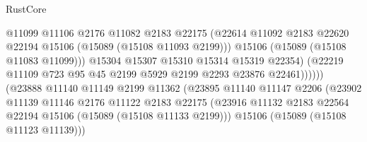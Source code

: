 \begin{lexlean}{RustCore}
\begin{coremodule}
                                          @11099
                                          @11106
                                          @2176
                                          @11082
                                          @2183
                                          @22175
                                          (@22614
                                            @11092
                                            @2183
                                            @22620
                                            @22194
                                            @15106
                                            (@15089 (@15108 @11093 @2199)))
                                          @15106
                                          (@15089 (@15108 @11083 @11099)))
                                        @15304
                                        @15307
                                        @15310
                                        @15314
                                        @15319
                                        @22354)
                                      (@22219
                                        @11109
                                        @723
                                        @95
                                        @45
                                        @2199
                                        @5929
                                        @2199
                                        @2293
                                        @23876
                                        @22461))))))
                            (@23888
                              @11140
                              @11149
                              @2199
                              @11362
                              (@23895
                                @11140
                                @11147
                                @2206
                                (@23902
                                  @11139
                                  @11146
                                  @2176
                                  @11122
                                  @2183
                                  @22175
                                  (@23916
                                    @11132
                                    @2183
                                    @22564
                                    @22194
                                    @15106
                                    (@15089 (@15108 @11133 @2199)))
                                  @15106
                                  (@15089 (@15108 @11123 @11139)))

\end{coremodule}
\end{lexlean}
